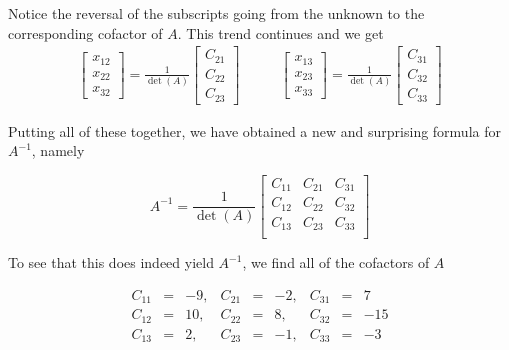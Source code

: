 \documentclass{ximera}
\begin{document}
Notice the reversal of the subscripts going from the unknown to the corresponding cofactor of $A$. This trend continues and we get
\[ \begin{array}{cc}

\left[ \begin{array}{r} x_{12} \\ x_{22} \\ x_{32} \end{array} \right] =  \frac{1}{\det(A)} \left[ \begin{array}{r} C_{21} \\ C_{22} \\ C_{23} \end{array} \right]

&
\qquad

\left[ \begin{array}{r} x_{13} \\ x_{23} \\ x_{33} \end{array} \right] =  \frac{1}{\det(A)} \left[ \begin{array}{r} C_{31} \\ C_{32} \\ C_{33} \end{array} \right]

\end{array}\]

Putting all of these together, we have obtained a new and surprising formula for $A^{-1}$, namely

\[ A^{-1} = \frac{1}{\det(A)} \left[ \begin{array}{ccc} C_{11} & C_{21} & C_{31} \\ C_{12} & C_{22} & C_{32} \\ C_{13} & C_{23} & C_{33} \\ \end{array} \right] \]

To see that this does indeed yield $A^{-1}$, we find all of the cofactors of $A$

\[\begin{array}{rcrrcrrcr}

C_{11} & = & -9, & C_{21} & = & -2, & C_{31} & = & 7\\

C_{12} & = & 10, & C_{22} & = & 8, & C_{32} & = & -15 \\

C_{13} & = &  2,  & C_{23} & = & -1,  & C_{33} & = & -3 \\

\end{array} \]
\end{document}
